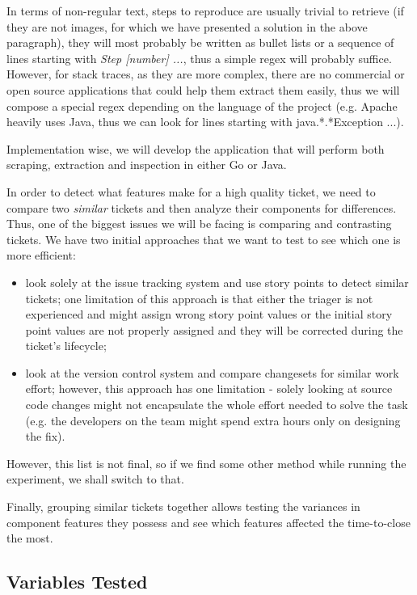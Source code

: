 \documentclass{mprop}
\begin{document}
In terms of non-regular text, steps to reproduce are usually trivial to
retrieve (if they are not images, for which we have presented a solution
in the above paragraph), they will most probably be written as bullet
lists or a sequence of lines starting with \emph{Step [number] ...}, thus
a simple regex will probably suffice. However, for stack traces, as they
are more complex, there are no commercial or open source applications
that could help them extract them easily, thus we will compose a special
regex depending on the language of the project (e.g. Apache heavily 
uses Java, thus we can look for lines starting with java.*.*Exception ...).

Implementation wise, we will develop the application that will
perform both scraping, extraction and inspection in either Go or Java.

In order to detect what features make for a high quality ticket, we need 
to compare two \emph{similar} tickets and then analyze their components
for differences. Thus, one of the biggest issues we will be facing is 
comparing and contrasting tickets. We have two initial approaches
that we want to test to see which one is more efficient:
  \begin{itemize}
    \item look solely at the issue tracking system and use story points
      to detect similar tickets; one limitation of this approach is that
      either the triager is not experienced and might assign wrong story
      point values or the initial story point values are not properly
      assigned and they will be corrected during the ticket's lifecycle;
    \item look at the version control system and compare changesets for
      similar work effort; however, this approach has one limitation - 
      solely looking at source code changes might not encapsulate the
      whole effort needed to solve the task (e.g. the developers on the
      team might spend extra hours only on designing the fix).
  \end{itemize}
However, this list is not final, so if we find some other method 
while running the experiment, we shall switch to that.

Finally, grouping similar tickets together allows testing 
the variances in component features they possess and see which features
affected the time-to-close the most.

\subsection{Variables Tested}\label{variables_tested}
\end{document}
